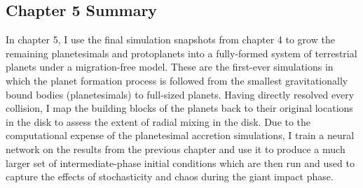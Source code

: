 \subsection{Chapter 5 Summary}

In chapter 5, I use the final simulation snapshots from chapter 4 to grow the remaining planetesimals and protoplanets into a fully-formed system of terrestrial planets under a migration-free model. These are the first-ever simulations in which the planet formation process is followed from the smallest gravitationally bound bodies (planetesimals) to full-sized planets. Having directly resolved every collision, I map the building blocks of the planets back to their original locations in the disk to assess the extent of radial mixing in the disk. Due to the computational expense of the planetesimal accretion simulations, I train a neural network on the results from the previous chapter and use it to produce a much larger set of intermediate-phase initial conditions which are then run and used to capture the effects of stochasticity and chaos during the giant impact phase.
